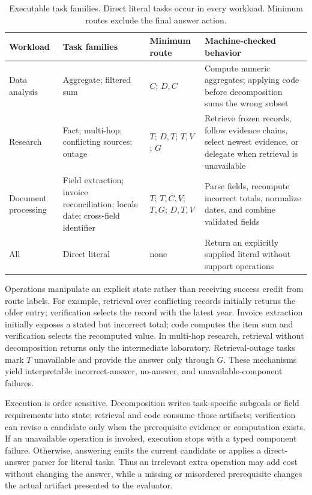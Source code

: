 \documentclass[letterpaper]{article} %
\begin{document}
\begin{table}[t]
\centering
\small
\caption{Executable task families. Direct literal tasks occur in every workload. Minimum routes exclude the final answer action.}
\label{tab:tasks}
\begin{tabular}{p{}p{}p{}p{}}
\toprule
Workload & Task families & Minimum route & Machine-checked behavior \\
\midrule
Data analysis & Aggregate; filtered sum & $C$; $D,C$ & Compute numeric aggregates; applying code before decomposition sums the wrong subset \\
Research & Fact; multi-hop; conflicting sources; outage & $T$; $D,T$; $T,V$; $G$ & Retrieve frozen records, follow evidence chains, select newest evidence, or delegate when retrieval is unavailable \\
Document processing & Field extraction; invoice reconciliation; locale date; cross-field identifier & $T$; $T,C,V$; $T,G$; $D,T,V$ & Parse fields, recompute incorrect totals, normalize dates, and combine validated fields \\
All & Direct literal & none & Return an explicitly supplied literal without support operations \\
\bottomrule
\end{tabular}
\end{table}

Operations manipulate an explicit state rather than receiving success credit from route labels. For example, retrieval over conflicting records initially returns the older entry; verification selects the record with the latest year. Invoice extraction initially exposes a stated but incorrect total; code computes the item sum and verification selects the recomputed value. In multi-hop research, retrieval without decomposition returns only the intermediate laboratory. Retrieval-outage tasks mark $T$ unavailable and provide the answer only through $G$. These mechanisms yield interpretable incorrect-answer, no-answer, and unavailable-component failures.

Execution is order sensitive. Decomposition writes task-specific subgoals or field requirements into state; retrieval and code consume those artifacts; verification can revise a candidate only when the prerequisite evidence or computation exists. If an unavailable operation is invoked, execution stops with a typed component failure. Otherwise, answering emits the current candidate or applies a direct-answer parser for literal tasks. Thus an irrelevant extra operation may add cost without changing the answer, while a missing or misordered prerequisite changes the actual artifact presented to the evaluator.
\end{document}
